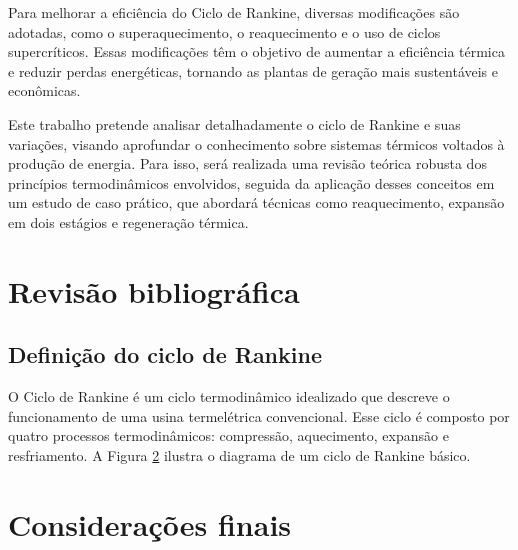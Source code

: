\documentclass[
	article,			%
	11pt,				%
	oneside,			%
	a4paper,			%
	english,			%
	brazil,				%
	sumario=tradicional
	]{abntex2}
\begin{document}
Para melhorar a eficiência do Ciclo de Rankine, diversas modificações são adotadas, como o superaquecimento, o reaquecimento e o uso de ciclos supercríticos. Essas modificações têm o objetivo de aumentar a eficiência térmica e reduzir perdas energéticas, tornando as plantas de geração mais sustentáveis e econômicas.

Este trabalho pretende analisar detalhadamente o ciclo de Rankine e suas variações, visando aprofundar o conhecimento sobre sistemas térmicos voltados à produção de energia. Para isso, será realizada uma revisão teórica robusta dos princípios termodinâmicos envolvidos, seguida da aplicação desses conceitos em um estudo de caso prático, que abordará técnicas como reaquecimento, expansão em dois estágios e regeneração térmica.

\section{Revisão bibliográfica}

\subsection{Definição do ciclo de Rankine}

O Ciclo de Rankine é um ciclo termodinâmico idealizado que descreve o funcionamento de uma usina termelétrica convencional. Esse ciclo é composto por quatro processos termodinâmicos: compressão, aquecimento, expansão e resfriamento. A Figura \ref{} ilustra o diagrama de um ciclo de Rankine básico.



%

\section{Considerações finais}

\postextual


\end{document}
